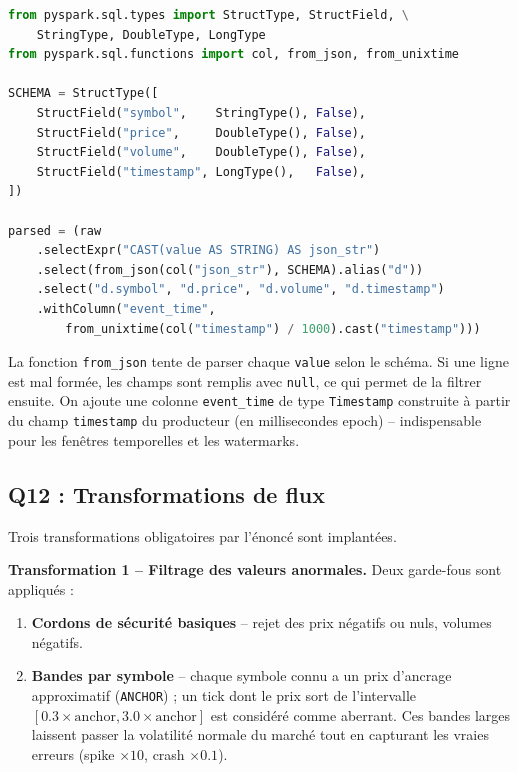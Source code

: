\documentclass{RapportINPTCLOUD}
\begin{document}
\begin{lstlisting}[style=code, language=Python]
from pyspark.sql.types import StructType, StructField, \
    StringType, DoubleType, LongType
from pyspark.sql.functions import col, from_json, from_unixtime

SCHEMA = StructType([
    StructField("symbol",    StringType(), False),
    StructField("price",     DoubleType(), False),
    StructField("volume",    DoubleType(), False),
    StructField("timestamp", LongType(),   False),
])

parsed = (raw
    .selectExpr("CAST(value AS STRING) AS json_str")
    .select(from_json(col("json_str"), SCHEMA).alias("d"))
    .select("d.symbol", "d.price", "d.volume", "d.timestamp")
    .withColumn("event_time",
        from_unixtime(col("timestamp") / 1000).cast("timestamp")))
\end{lstlisting}

La fonction \texttt{from\_json} tente de parser chaque \texttt{value} selon le sch\'{e}ma. Si une ligne est mal form\'{e}e, les champs sont remplis avec \texttt{null}, ce qui permet de la filtrer ensuite. On ajoute une colonne \texttt{event\_time} de type \texttt{Timestamp} construite \`{a} partir du champ \texttt{timestamp} du producteur (en millisecondes epoch) -- indispensable pour les fen\^{e}tres temporelles et les watermarks.

\subsection{Q12 : Transformations de flux}

Trois transformations obligatoires par l'\'{e}nonc\'{e} sont implant\'{e}es.

\textbf{Transformation 1 -- Filtrage des valeurs anormales.} Deux garde-fous sont appliqu\'{e}s :
\begin{enumerate}[leftmargin=2em]
    \item \textbf{Cordons de s\'{e}curit\'{e} basiques} -- rejet des prix n\'{e}gatifs ou nuls, volumes n\'{e}gatifs.
    \item \textbf{Bandes par symbole} -- chaque symbole connu a un prix d'ancrage approximatif (\texttt{ANCHOR}) ; un tick dont le prix sort de l'intervalle $[0.3 \times \text{anchor}, 3.0 \times \text{anchor}]$ est consid\'{e}r\'{e} comme aberrant. Ces bandes larges laissent passer la volatilit\'{e} normale du march\'{e} tout en capturant les vraies erreurs (spike $\times 10$, crash $\times 0.1$).
\end{enumerate}
\end{document}
